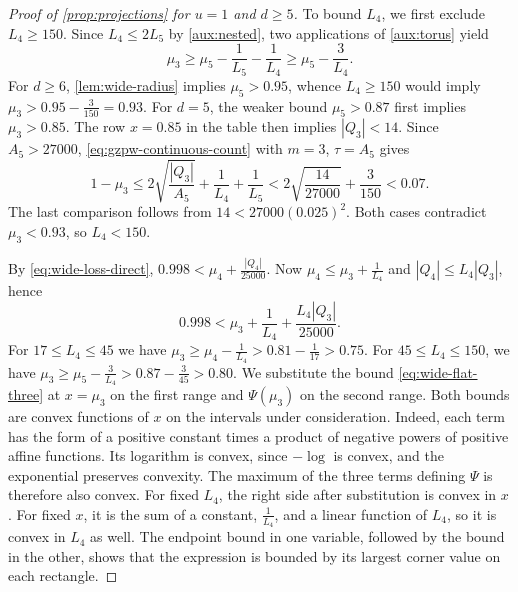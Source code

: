 \documentclass[reqno, 11pt]{article}
\numberwithin{equation}{section}
\theoremstyle{definition}
\begin{document}
\begin{proof}[Proof of \cref{prop:projections} for $u=1$ and $d\ge5$]
To bound $L_4$, we first exclude $L_4\ge150$. Since $L_4\le2L_5$ by
\eqref{aux:nested}, two applications of \cref{aux:torus} yield
\[
 \mu_3\ge\mu_5-\frac{1}{L_5}-\frac{1}{L_4}\ge\mu_5-\frac{3}{L_4}.
\]
For $d\ge6$, \cref{lem:wide-radius} implies $\mu_5>0.95$, whence
$L_4\ge150$ would imply $\mu_3>0.95-\frac{3}{150}=0.93$.
For $d=5$, the weaker bound $\mu_5>0.87$ first implies $\mu_3>0.85$.
The row $x=0.85$ in the table then implies $|Q_3|<14$. Since $A_5>27000$,
\eqref{eq:gzpw-continuous-count} with $m=3$, $\tau=A_5$ gives
\[
 1-\mu_3\le2\sqrt{\frac{|Q_3|}{A_5}}+\frac{1}{L_4}+\frac{1}{L_5}
           <2\sqrt{\frac{14}{27000}}+\frac{3}{150}<0.07 .
\]
The last comparison follows from $14<27000(0.025)^2$. Both cases
contradict $\mu_3<0.93$, so $L_4<150$.

By \eqref{eq:wide-loss-direct}, $0.998<\mu_4+\frac{|Q_4|}{25000}$.
Now $\mu_4\le\mu_3+\frac{1}{L_4}$ and $|Q_4|\le L_4|Q_3|$, hence
\begin{equation}\label{eq:wide-rectangle}
             0.998<\mu_3+\frac{1}{L_4}+\frac{L_4|Q_3|}{25000}.
\end{equation}
For $17\le L_4\le45$ we have
$\mu_3\ge\mu_4-\frac{1}{L_4}>0.81-\frac{1}{17}>0.75$.
For $45\le L_4\le150$, we have
$\mu_3\ge\mu_5-\frac{3}{L_4}>0.87-\frac{3}{45}>0.80$.
We substitute the bound \eqref{eq:wide-flat-three} at $x=\mu_3$ on
the first range and $\Psi(\mu_3)$ on the second range. Both bounds
are convex functions of $x$ on the intervals under consideration.
Indeed, each term has the form of a positive constant times a product
of negative powers of positive affine functions. Its logarithm is convex,
since $-\log$ is convex, and the exponential preserves convexity.
The maximum of the three terms defining $\Psi$ is therefore also convex.
For fixed $L_4$, the right side after substitution is convex in $x$.
For fixed $x$, it is the sum of a constant, $\frac{1}{L_4}$, and a
linear function of $L_4$, so it is convex in $L_4$ as well. The
endpoint bound in one variable, followed by the bound in the other, shows that
the expression is bounded by its largest corner value on each rectangle.


\end{proof}
\end{document}

